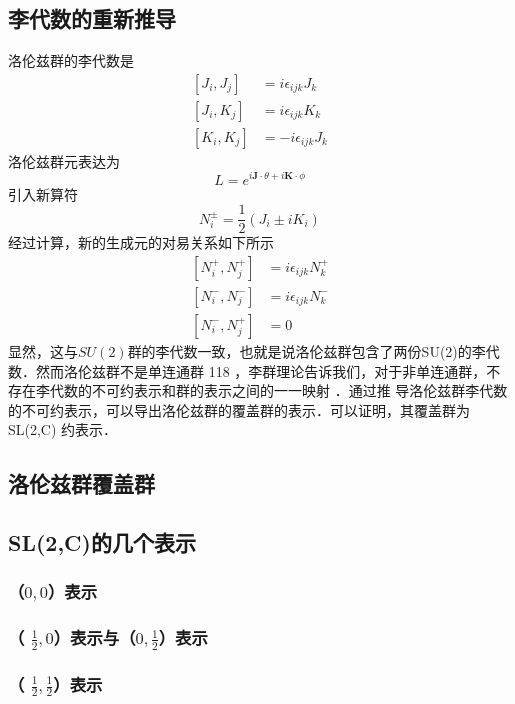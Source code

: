\subsection{李代数的重新推导}
洛伦兹群的李代数是
\begin{equation}
\begin{aligned}
\left[J_{i}, J_{j}\right] &=i \epsilon_{i j k} J_{k} \\
\left[J_{i}, K_{j}\right] &=i \epsilon_{i j k} K_{k} \\
\left[K_{i}, K_{j}\right] &=-i \epsilon_{i j k} J_{k}
\end{aligned}
\end{equation}
洛伦兹群元表达为
\begin{equation}
L=e^{i \mathbf{J} \cdot \theta+i \mathbf{K} \cdot \phi}
\end{equation}
引入新算符
\begin{equation}
N_{i}^{\pm}=\frac{1}{2}\left(J_{i} \pm i K_{i}\right)
\end{equation}
经过计算，新的生成元的对易关系如下所示
\begin{equation}
\begin{aligned}
\left[N_{i}^{+}, N_{j}^{+}\right] &=i \epsilon_{i j k} N_{k}^{+} \\
\left[N_{i}^{-}, N_{j}^{-}\right] &=i \epsilon_{i j k} N_{k}^{-} \\
\left[N_{i}^{-}, N_{j}^{+}\right] &=0
\end{aligned}
\end{equation}
显然，这与$SU(2)$群的李代数一致，也就是说洛伦兹群包含了两份SU(2)的李代数．然而洛伦兹群不是单连通群 118 ，李群理论告诉我们，对于非单连通群，不存在李代数的不可约表示和群的表示之间的一一映射 ．通过推
导洛伦兹群李代数的不可约表示，可以导出洛伦兹群的覆盖群的表示．可以证明，其覆盖群为SL(2,C)
约表示．
\subsection{洛伦兹群覆盖群}
\subsection{SL(2,C)的几个表示}
\subsubsection{（$0,0$）表示}
\subsubsection{（ $\frac{1}{2},0$）表示与（$0,\frac{1}{2}$）表示}
\subsubsection{（ $\frac{1}{2},\frac{1}{2}$）表示}